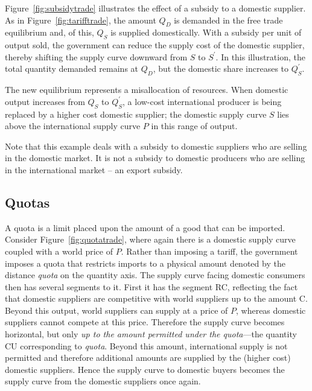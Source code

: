 Figure~\ref{fig:subsidytrade} illustrates the effect of a subsidy to a domestic supplier. As in Figure~\ref{fig:tarifftrade}, the amount $Q_D$ is demanded in the free trade equilibrium and, of this, $Q_S$ is supplied domestically. With a subsidy per unit of output sold, the government can reduce the supply cost of the domestic supplier, thereby shifting the supply curve downward from $S$ to $S^{'}$. In this illustration, the total quantity demanded remains at $Q_D$, but the domestic share increases to $Q_S^{'}$.



The new equilibrium represents a misallocation of resources. When domestic output increases from $Q_S$ to $Q_S^{'}$, a low-cost international producer is being replaced by a higher cost domestic supplier; the domestic supply curve $S$ lies above the international supply curve $P$ in this range of output.

Note that this example deals with a subsidy to domestic suppliers who are selling in the domestic market. It is not a subsidy to domestic producers who are selling in the international market -- an export subsidy.

\subsection*{Quotas}

A quota is a limit placed upon the amount of a good that can be imported. Consider Figure~\ref{fig:quotatrade}, where again there is a domestic supply curve coupled with a world price of $P$. Rather than imposing a tariff, the government imposes a quota that restricts imports to a physical amount denoted by the distance \textit{quota} on the quantity axis. The supply curve facing domestic consumers then has several segments to it. First it has the segment RC, reflecting the fact that domestic suppliers are competitive with world suppliers up to the amount C. Beyond this output, world suppliers can supply at a price of $P$, whereas domestic suppliers cannot compete at this price. Therefore the supply curve becomes horizontal, but only \textit{up to the amount permitted under the quota}---the quantity CU corresponding to \textit{quota}. Beyond this amount, international supply is not permitted and therefore additional amounts are supplied by the (higher cost) domestic suppliers. Hence the supply curve to domestic buyers becomes the supply curve from the domestic suppliers once again.

